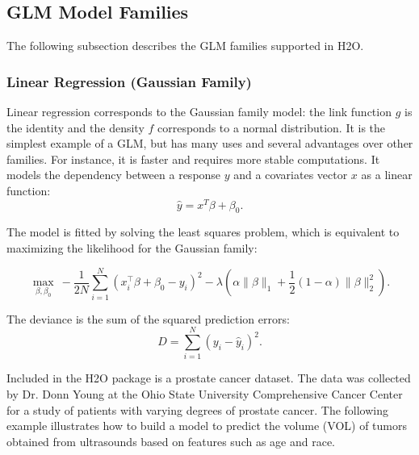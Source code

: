 
\subsection{GLM Model Families}
The following subsection describes the GLM families supported in H2O. 

\subsubsection{Linear Regression (Gaussian Family)}
Linear regression corresponds to the Gaussian family model: the link function $g$ is the identity and the density $f$ corresponds to a normal distribution. It is the simplest example of a GLM, but has many uses and
several advantages over other families. For instance, it is faster and requires more stable computations. It models the dependency between a response $y$ and a covariates vector $x$ as a linear function:
$$ \hat{y} = x^T\beta + \beta_0.$$

The model is fitted by solving the least squares problem, which is equivalent to maximizing the likelihood for the Gaussian family:

$$ \max_{\beta,\beta_0} \ - \frac{1}{2N} \sum_{i=1}^N  (x_i^{\top}\beta + \beta_0 - y_i)^2  - \lambda \left(  \alpha \|\beta \|_1 +  \frac{1}{2} (1- \alpha) \| \beta \|_2^2 \right).$$

The deviance is the sum of the squared prediction errors: 
$$ D = \sum_{i=1}^{N} (y_i - \hat{y}_i)^2 . $$


Included in the H2O package is a prostate cancer dataset. The data was collected by Dr. Donn Young at the Ohio State
University Comprehensive Cancer Center for a study of patients with varying degrees of prostate cancer. The
following example illustrates how to build a model to predict the volume (VOL) of tumors obtained from ultrasounds
based on features such as age and race.

\waterExampleInR



\waterExampleInPython


